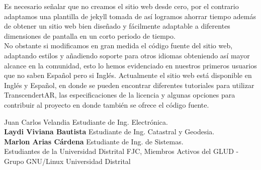 \begin{multicols}{2}
Es necesario señalar que no creamos el sitio web desde cero, por el contrario adaptamos una plantilla de jekyll tomada de {\color{introcolor}{www.jekyllthemes.org}} así logramos ahorrar tiempo además de obtener un sitio web bien diseñado y fácilmente adaptable a diferentes dimensiones de pantalla en un corto periodo de tiempo. 
\\

No obstante si modificamos en gran medida el código fuente del sitio web, adaptando estilos y añadiendo soporte para otros idiomas obteniendo así mayor alcance en la comunidad, esto lo hemos evidenciado en nuestros primeros usuarios que no saben Español pero si Inglés. Actualmente el sitio web está disponible en Inglés y Español, en donde se pueden encontrar diferentes tutoriales para utilizar TranscendertAR, las especificaciones de la licencia y algunas opciones para contribuir al proyecto en donde también se ofrece el código fuente.







\begin{biografia}{}{Juan Carlos Velandia} 
Estudiante de Ing. Electrónica.\\
\textbf {Laydi Viviana Bautista} Estudiante de Ing. Catastral y Geodesia.\\
\textbf {Marlon Arias Cárdena} Estudiante de Ing. de Sistemas.\\

Estudiantes de la Universidad Distrital FJC, Miembros Activos del GLUD - Grupo GNU/Linux Universidad Distrital
\end{biografia}




\raggedcolumns
\pagebreak


\end{multicols}

